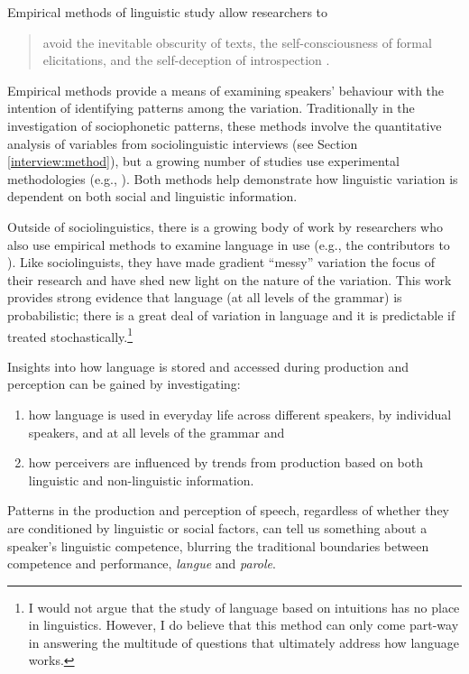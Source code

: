 Empirical methods of linguistic study allow researchers to

\begin{quote}
avoid the inevitable obscurity of texts, the self-con\-scious\-ness of formal elicitations, and the self-deception of introspection \cite[xix]{labov1972sociolingpatterns}.
\end{quote}

\noindent Empirical methods provide a means of examining speakers' behaviour with the intention of identifying patterns among the variation.  Traditionally in the investigation of sociophonetic patterns, these methods involve the quantitative analysis of variables from sociolinguistic interviews (see Section \ref{interview:method}), but a growing number of studies use experimental methodologies (e.g., \citealt{koopsetal2008,staumcasasantoetal2010,labovetal2011}).  Both methods help demonstrate how linguistic variation is dependent on both social and linguistic information.


Outside of sociolinguistics, there is a growing body of work by researchers who also use empirical methods to examine  language in use (e.g., the contributors to ). Like sociolinguists, they have made gradient ``messy'' variation the focus of their research and have shed new light on the nature of the variation.  This work provides strong evidence that language (at all levels of the grammar) is probabilistic; there is a great deal of variation in language and it is predictable if treated stochastically.\footnote{I would not argue that the study of language based on intuitions has no place in linguistics.  However, I do believe that this method can only come part-way in answering the multitude of questions that ultimately address how language works.}

Insights into how language is stored and accessed during production and perception can be gained by investigating: \nocite{saussure1916}   

\begin{enumerate}
	\item how language is used in everyday life across different speakers, by individual speakers, and at all levels of the grammar and
	\item how perceivers are influenced by trends from production based on both linguistic and non-linguistic information.
\end{enumerate}

\noindent Patterns in the production and perception of speech, regardless of whether they are conditioned by linguistic or social factors, can tell us something about a speaker's linguistic competence, blurring the traditional boundaries between competence and performance, \textit{langue} and \textit{parole}.  


